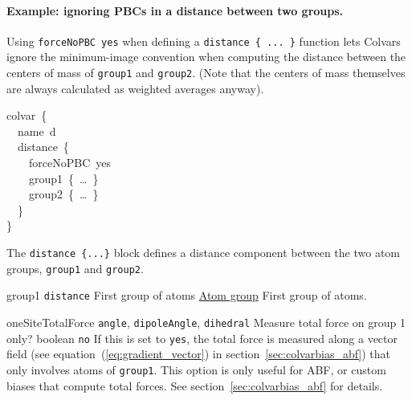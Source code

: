 \paragraph*{Example: ignoring PBCs in a distance between two groups.}  Using \texttt{forceNoPBC yes} when defining a
\texttt{distance \{ ... \}} function lets Colvars ignore the minimum-image convention when computing the distance between the centers of mass of \texttt{group1} and \texttt{group2}.  (Note that the centers of mass themselves are always calculated as weighted averages anyway).

\begin{cvexampleinput}
\-colvar~\{\\
\-~~name~d\\
\-~~distance~\{\\
\-~~~~forceNoPBC~yes\\
\-~~~~group1~\{~\ldots~\}\\
\-~~~~group2~\{~\ldots~\}\\
\-~~\}\\
\-\}\\
\end{cvexampleinput}





The \texttt{distance \{...\}} block defines a distance component between the two atom groups, \texttt{group1} and \texttt{group2}.

\begin{cvcoptions}
\item %
  \key
    {group1}{%
    \texttt{distance}}{%
    First group of atoms}{%
    \hyperref[sec:colvar_atom_groups]{Atom group}}{%
    First group of atoms.}

\item %

\item %
  \keydef
    {oneSiteTotalForce}{%
    \texttt{angle}, \texttt{dipoleAngle}, \texttt{dihedral}}{%
    Measure total force on group 1 only?}{%
    boolean}{%
    \texttt{no}}{%
    If this is set to \texttt{yes}, the total force is measured along
    a vector field (see equation~(\ref{eq:gradient_vector}) in
    section~\ref{sec:colvarbias_abf}) that only involves atoms of
    \texttt{group1}.  This option is only useful for ABF, or custom
    biases that compute total forces.  See
    section~\ref{sec:colvarbias_abf} for details.}

\end{cvcoptions}

